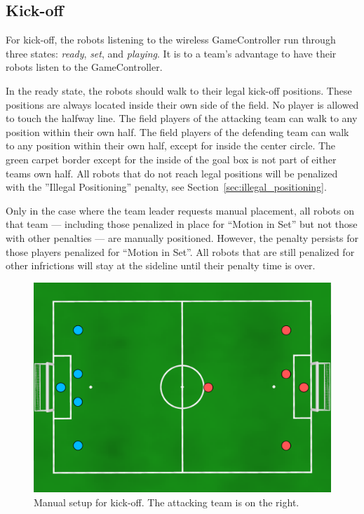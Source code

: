 \documentclass[12pt]{article}
\begin{document}
\subsection{Kick-off}
\label{sec:kick-off}
For kick-off, the robots listening to the wireless GameController run through three states: \emph{ready}, \emph{set}, and \emph{playing}. It is to a team's advantage to have their robots listen to the GameController.  

In the ready state, the robots should walk to their legal kick-off positions. These positions are always located inside their own side of the field. No player is allowed to touch the halfway line.
The field players of the attacking team can walk to any position within their own half.
The field players of the defending team can walk to any position within their own half, except for inside the center circle. The green carpet border except for the inside of the goal box is not part of either teams own half. All robots that do not reach legal positions will be penalized with the ''Illegal Positioning'' penalty, see Section~\ref{sec:illegal_positioning}.

Only in the case where the team leader requests manual placement, all robots on that team --- including those penalized in place for ``Motion in Set'' but not those with other penalties --- are manually positioned. However, the penalty persists for those players penalized for ``Motion in Set''. All robots that are still penalized for other infrictions will stay at the sideline until their penalty time is over. 

\begin{figure}[t]
\centerline{\includegraphics[width=\columnwidth]{figs/manual-placement-2015.pdf}}
\caption{Manual setup for kick-off.  The attacking team is on the right.}
\label{fig:ko}
\end{figure}
\end{document}
